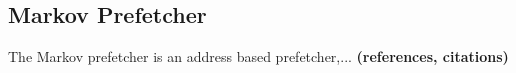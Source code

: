 \subsection{Markov Prefetcher}
\label{sec:markovPrefetcher}
The Markov prefetcher is an address based prefetcher,...
{\bf (references, citations)}